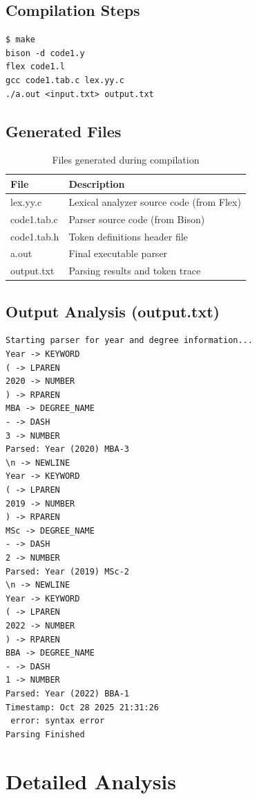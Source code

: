\documentclass[12pt,a4paper]{article}
\begin{document}
\subsection{Compilation Steps}
\begin{verbatim}
$ make
bison -d code1.y
flex code1.l
gcc code1.tab.c lex.yy.c
./a.out <input.txt> output.txt
\end{verbatim}

\subsection{Generated Files}
\begin{table}[h]
\centering
\begin{tabular}{|l|l|}
\hline
\textbf{File} & \textbf{Description} \\
\hline
lex.yy.c & Lexical analyzer source code (from Flex) \\
code1.tab.c & Parser source code (from Bison) \\
code1.tab.h & Token definitions header file \\
a.out & Final executable parser \\
output.txt & Parsing results and token trace \\
\hline
\end{tabular}
\caption{Files generated during compilation}
\end{table}

\subsection{Output Analysis (output.txt)}
\begin{lstlisting}[caption={Complete parsing output with tokenization}]
Starting parser for year and degree information...
Year -> KEYWORD
( -> LPAREN
2020 -> NUMBER
) -> RPAREN
MBA -> DEGREE_NAME
- -> DASH
3 -> NUMBER
Parsed: Year (2020) MBA-3
\n -> NEWLINE
Year -> KEYWORD
( -> LPAREN
2019 -> NUMBER
) -> RPAREN
MSc -> DEGREE_NAME
- -> DASH
2 -> NUMBER
Parsed: Year (2019) MSc-2
\n -> NEWLINE
Year -> KEYWORD
( -> LPAREN
2022 -> NUMBER
) -> RPAREN
BBA -> DEGREE_NAME
- -> DASH
1 -> NUMBER
Parsed: Year (2022) BBA-1
Timestamp: Oct 28 2025 21:31:26
 error: syntax error
Parsing Finished
\end{lstlisting}

\section{Detailed Analysis}
\end{document}
